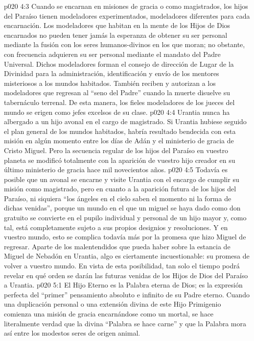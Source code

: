 \vs p020 4:3 Cuando se encarnan en misiones de gracia o como magistrados, los hijos del Paraíso tienen modeladores experimentados, modeladores diferentes para cada encarnación. Los modeladores que habitan en la mente de los Hijos de Dios encarnados no pueden tener jamás la esperanza de obtener su ser personal mediante la fusión con los seres humanos\hyp{}divinos en los que moran; no obstante, con frecuencia adquieren su ser personal mediante el mandato del Padre Universal. Dichos modeladores forman el consejo de dirección de Lugar de la Divinidad para la administración, identificación y envío de los mentores misteriosos a los mundos habitados. También reciben y autorizan a los modeladores que regresan al “seno del Padre” cuando la muerte disuelve su tabernáculo terrenal. De esta manera, los fieles modeladores de los jueces del mundo se erigen como jefes excelsos de su clase.
\vs p020 4:4 \pc Urantia nunca ha albergado a un hijo avonal en el cargo de magistrado. Si Urantia hubiese seguido el plan general de los mundos habitados, habría resultado bendecida con esta misión en algún momento entre los días de Adán y el ministerio de gracia de Cristo Miguel. Pero la secuencia regular de los hijos del Paraíso en vuestro planeta se modificó totalmente con la aparición de vuestro hijo creador en su último ministerio de gracia hace mil novecientos años.
\vs p020 4:5 Todavía es posible que un avonal se encarne y visite Urantia con el encargo de cumplir su misión como magistrado, pero en cuanto a la aparición futura de los hijos del Paraíso, ni siquiera “los ángeles en el cielo saben el momento ni la forma de dichas venidas”, porque un mundo en el que un miguel se haya dado como don gratuito se convierte en el pupilo individual y personal de un hijo mayor y, como tal, está completamente sujeto a sus propios designios y resoluciones. Y en vuestro mundo, esto se complica todavía más por la promesa que hizo Miguel de regresar. Aparte de los malentendidos que pueda haber sobre la estancia de Miguel de Nebadón en Urantia, algo es ciertamente incuestionable: su promesa de volver a vuestro mundo. En vista de esta posibilidad, tan solo el tiempo podrá revelar en qué orden se darán las futuras venidas de los Hijos de Dios del Paraíso a Urantia.
\vs p020 5:1 El Hijo Eterno es la Palabra eterna de Dios; es la expresión perfecta del “primer” pensamiento absoluto e infinito de su Padre eterno. Cuando una duplicación personal o una extensión divina de este Hijo Primigenio comienza una misión de gracia encarnándose como un mortal, se hace literalmente verdad que la divina “Palabra se hace carne” y que la Palabra mora así entre los modestos seres de origen animal.
